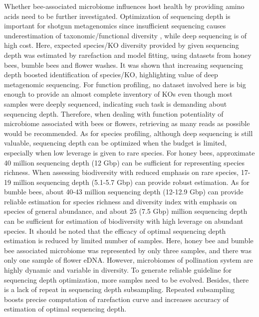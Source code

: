 \documentclass[11pt]{article}
\begin{document}
Whether bee-associated microbiome influences host health by providing amino acids need to be further investigated. 
\newline
Optimization of sequencing depth is important for shotgun metagenomics since insufficient sequencing causes underestimation of taxonomic/functional diversity \citep{cattonaro2018you,zaheer2018impact,gweon2019impact,pereira2019impact}, while deep sequencing is of high cost. 
Here, expected species/KO diversity provided by given sequencing depth was estimated by rarefaction and model fitting, using datasets from honey bees, bumble bees and flower washes. 
It was shown that increasing sequencing depth boosted identification of species/KO, highlighting value of deep metagenomic sequencing. 
For function profiling, no dataset involved here is big enough to provide an almost complete inventory of KOs even though most samples were deeply sequenced, indicating such task is demanding about sequencing depth. 
Therefore, when dealing with function potentiality of microbiome associated with bees or flowers, retrieving as many reads as possible would be recommended. 
As for species profiling, although deep sequencing is still valuable, sequencing depth can be optimized when the budget is limited, especially when low leverage is given to rare species. 
For honey bees, approximate 40 million sequencing depth (12 Gbp) can be sufficient for representing species richness. 
When assessing biodiversity with reduced emphasis on rare species, 17-19 million sequencing depth (5.1-5.7 Gbp) can provide robust estimation. 
As for bumble bees, about 40-43 million sequencing depth (12-12.9 Gbp) can provide reliable estimation for species richness and diversity index with emphasis on species of general abundance, and about 25 (7.5 Gbp) million sequencing depth can be sufficient for estimation of biodiversity with high leverage on abundant species. 
It should be noted that the efficacy of optimal sequencing depth estimation is reduced by limited number of samples. 
Here, honey bee and bumble bee associated microbiome was represented by only three samples, and there was only one sample of flower eDNA. 
However, microbiomes of pollination system are highly dynamic and variable in diversity. 
To generate reliable guideline for sequencing depth optimization, more samples need to be evolved. 
Besides, there is a lack of repeat in sequencing depth subsampling. 
Repeated subsampling boosts precise computation of rarefaction curve and increases accuracy of estimation of optimal sequencing depth. 
\end{document}
